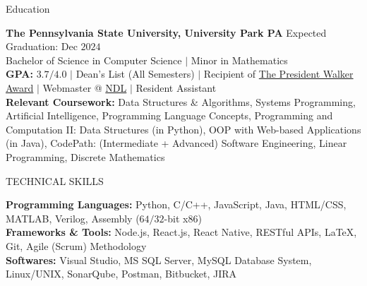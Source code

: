 \documentclass{resume} %
\begin{document}

\begin{rSection}{Education}

{\bf The Pennsylvania State University, University Park PA} \hfill {Expected Graduation: Dec $2024$}\\
{Bachelor of Science in Computer Science $\vert$ Minor in Mathematics}\\
{\bf GPA:} $3.7/4.0$ $\vert$ Dean's List (All Semesters) $\vert$ Recipient of \href{https://awardsrecognition.psu.edu/student/undergraduate-scholastic-awards/}{The President Walker Award} $\vert$ Webmaster @ \href{https://ndl.psu.edu/}{NDL} $\vert$ Resident Assistant\\
{\bf Relevant Coursework:} Data Structures \& Algorithms, Systems Programming, Artificial Intelligence, Programming Language Concepts, Programming and Computation II: Data Structures (in Python), OOP with Web-based Applications (in Java), CodePath: (Intermediate + Advanced) Software Engineering, Linear Programming, Discrete Mathematics
\end{rSection}


\begin{rSection}{TECHNICAL SKILLS}

{\bf Programming Languages:} Python, C/C++, JavaScript, Java, HTML/CSS, MATLAB, Verilog, Assembly ($64/32$-bit x$86$)\\
{\bf Frameworks \& Tools:} Node.js, React.js, React Native, RESTful APIs, \LaTeX, Git, Agile (Scrum) Methodology\\
{\bf Softwares:} Visual Studio, MS SQL Server, MySQL Database System, Linux/UNIX, SonarQube, Postman, Bitbucket, JIRA

\end{rSection}
\end{document}
